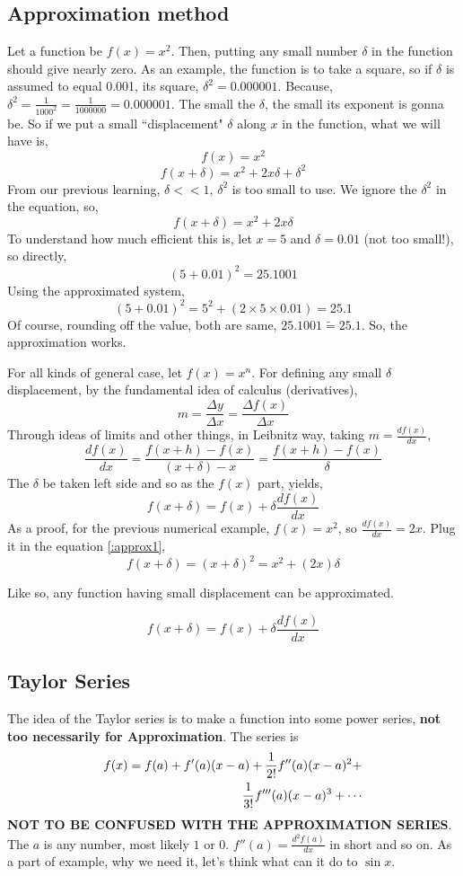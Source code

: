 \documentclass[11pt,a4paper,twocolumn,openright]{article}
\theoremstyle{definition}
\theoremstyle{definition}
\theoremstyle{definition}
\theoremstyle{definition}
\begin{document}
\subsection{\small{Approximation method}}
Let a function be $f(x) = x^2 $. Then, putting any small number $\delta$ in the function should give nearly zero. As an example, the function is to take a square, so if $\delta$ is assumed to equal 0.001, its square, $ \delta^2 = 0.000001 $. Because, $ \delta ^2 = \frac{1}{1000^2} = \frac{1}{1000000} = 0.000001 $. The small the $\delta$, the small its exponent is gonna be. So if we put a small ``displacement" $\delta$ along $x$ in the function, what we will have is,
\[ f(x)= x^2 \]
\[ f(x + \delta ) = x^2 + 2x\delta + \delta^2 \]
From our previous learning, $\delta << 1  $, $\delta ^2$ is too small to use. We ignore the $\delta^2$ in the equation, so,
\[ f(x + \delta) = x^2 +2x \delta \]
To understand how much efficient this is, let $ x =5 $ and $ \delta = 0.01$ (not too small!), so directly,
\[ (5 + 0.01)^2 = 25.1001 \]
Using the approximated system, 
\[ (5 + 0.01)^2 = 5^2 + ( 2 \times 5 \times 0.01 ) = 25.1 \]
Of course, rounding off the value, both are same, $25.1001 \tilde{=} 25.1$. So, the approximation works.


For all kinds of general case, let $f(x) = x^n $. For defining any small $\delta$ displacement, by the fundamental idea of calculus (derivatives),
\[ m = \frac{\Delta y}{\Delta x} = \frac{\Delta f(x)}{\Delta x}\] 
Through ideas of limits and other things, in Leibnitz way, taking $m = \frac{d f(x)}{dx}$,
\[ \frac{d f(x)}{dx} = \frac{ f(x + h) - f(x) }{(x + \delta) - x} = \frac{ f(x + h) - f(x) }{\delta}\]
The $\delta$ be taken left side and so as the $f(x)$ part, yields,
\begin{equation} \label{:approx1}
f(x+\delta) = f(x) + \delta \frac{d f(x)}{dx} 
\end{equation}
As a proof, for the previous numerical example, $f(x) = x^2 $, so $ \frac{d f(x)}{dx} = 2x $. Plug it in the equation \ref{:approx1},
\[ f(x + \delta) = (x + \delta)^2 = x^2 + ( 2x) \delta \]


Like so, any function having small displacement can be approximated. 

\begin{equation}
f(x + \delta) = f(x) + \delta \frac{df(x)}{dx}  
\end{equation}

\subsection{\small{Taylor Series}}
The idea of the Taylor series is to make a function into some power series, \textbf{not too necessarily for Approximation}. The series is 
\begin{align}
f(x) = f(a) + f'(a) (x - a) + \frac{1}{2!} f''(a) (x - a)^2 + \notag \\
 \frac{1}{3!} f'''(a) (x-a)^3 + \cdots
\end{align}
\textbf{NOT TO BE CONFUSED WITH THE APPROXIMATION SERIES}. The $a$ is any number, most likely $1$ or $0$. $f''(a) = \frac{d^2 f(a)}{dx}$ in short and so on. As a part of example, why we need it, let's think what can it do to $\sin x$.
\end{document}
